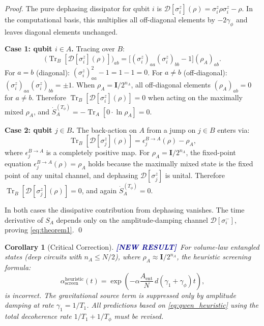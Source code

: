 \documentclass[12pt,a4paper]{article}
\newcommand{\NEW}{\textcolor{darkblue}{\textbf{[NEW RESULT]}}}
\theoremstyle{monette}
\newtheorem{corollary}[theorem]{Corollary}
\theoremstyle{definition}
\newcommand{\SA}{S_A}
\newcommand{\asc}{\alpha_{\mathrm{screen}}}
\newcommand{\gamone}{\gamma_1}
\newcommand{\gamphi}{\gamma_\phi}
\newcommand{\Tone}{T_1}
\newcommand{\Tphi}{T_\phi}
\newcommand{\rhored}{\rho_A}
\newcommand{\Diss}{\mathcal{D}}
\renewcommand{\Tr}{\operatorname{Tr}}
\begin{document}
\begin{proof}
The pure dephasing dissipator for qubit $i$ is
$\Diss[\sigma_i^z](\rho) = \sigma_i^z\rho\sigma_i^z - \rho$.
In the computational basis, this multiplies all off-diagonal elements by $-2\gamphi$
and leaves diagonal elements unchanged.

\medskip
\textbf{Case 1: qubit $i \in A$.}
Tracing over $B$:
\begin{equation}
  \bigl(\Tr_B[\Diss[\sigma_i^z](\rho)]\bigr)_{ab}
  = \bigl[(\sigma_i^z)_{aa}(\sigma_i^z)_{bb} - 1\bigr](\rhored)_{ab}.
  \label{eq:case1}
\end{equation}
For $a = b$ (diagonal): $(\sigma_i^z)_{aa}^2 - 1 = 1 - 1 = 0$.
For $a \neq b$ (off-diagonal): $(\sigma_i^z)_{aa}(\sigma_i^z)_{bb} = \pm 1$.
When $\rhored = \mathbf{I}/2^{n_A}$, all off-diagonal elements $(\rhored)_{ab} = 0$
for $a \neq b$. Therefore $\Tr_B[\Diss[\sigma_i^z](\rho)] = 0$
when acting on the maximally mixed $\rhored$, and
$\dot{S}_A^{(\Tphi)} = -\Tr_A[0 \cdot \ln\rhored] = 0$.

\medskip
\textbf{Case 2: qubit $j \in B$.}
The back-action on $A$ from a jump on $j \in B$ enters via:
\begin{equation}
  \Tr_B[\Diss[\sigma_j^z](\rho)] = \epsilon_{j}^{B\to A}(\rho) - \rhored,
  \label{eq:case2}
\end{equation}
where $\epsilon_j^{B\to A}$ is a completely positive map.
For $\rhored = \mathbf{I}/2^{n_A}$, the fixed-point equation
$\epsilon_j^{B\to A}(\rho) = \rhored$ holds because the maximally mixed state
is the fixed point of any unital channel,
and dephasing $\Diss[\sigma_j^z]$ is unital.
Therefore $\Tr_B[\Diss[\sigma_j^z](\rho)] = 0$, and again
$\dot{S}_A^{(\Tphi)} = 0$.

\medskip
In both cases the dissipative contribution from dephasing vanishes.
The time derivative of $\SA$ depends only on the amplitude-damping channel
$\Diss[\sigma_i^-]$, proving \cref{eq:theorem1}. \qed
\end{proof}

\begin{corollary}[Critical Correction]
\label{cor:correction}
\NEW\ For volume-law entangled states (deep circuits with $n_A \leq N/2$),
where $\rhored \approx \mathbf{I}/2^{n_A}$, the heuristic screening formula:
\begin{equation}
  \asc^{\mathrm{heuristic}}(t) = \exp\!\left(-\alpha\frac{A_{\mathrm{ent}}}{N}\,
    d\left(\gamone + \gamphi\right)t\right),
  \label{eq:qwen_heuristic}
\end{equation}
is incorrect. The gravitational source term is suppressed only by amplitude
damping at rate $\gamone = 1/\Tone$. All predictions based on \cref{eq:qwen_heuristic}
using the total decoherence rate $1/\Tone + 1/\Tphi$ must be revised.
\end{corollary}
\end{document}
